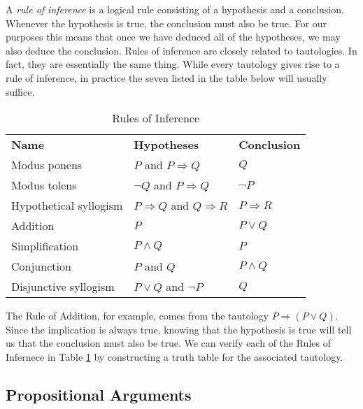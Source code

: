 A \emph{rule of inference} is a logical rule consisting of a hypothesis and a conclusion. Whenever the hypothesis is true, the conclusion must also be true. For our purposes this means that once we have deduced all of the hypotheses, we may also deduce the conclusion. Rules of inference are closely related to tautologies.  In fact, they are essentially the same thing. While every tautology gives rise to a rule of inference, in practice the seven listed in the table below will usually suffice.

{\renewcommand\arraystretch{1.2}
\begin{table}[htbp]
\centering
\caption{Rules of Inference}
\begin{tabular}{l l l}
&&\\
\hline 
\bfseries Name & \bfseries Hypotheses & \bfseries Conclusion\\
\hline
Modus ponens\index{rule of inference!modus ponens|textbf} & $P$ and $P\Rightarrow Q$ & $Q$\\
Modus tolens \index{rule of inference!modus tolens|textbf} & $\neg Q$ and $P\Rightarrow Q$ & $\neg P$\\
Hypothetical syllogism \index{rule of inference!hypothetical syllogism|textbf} & $P\Rightarrow Q$ and $Q\Rightarrow R$ & $P\Rightarrow R$\\
Addition \index{rule of inference!addition|textbf} & $P$ & $P\lor Q$\\
Simplification \index{rule of inference!simplification|textbf} & $P\land Q$ & $P$\\
Conjunction \index{rule of inference!conjunction|textbf} & $P$ and $Q$ & $P\land Q$\\
Disjunctive syllogism \index{rule of inference!disjunctive syllogism|textbf} & $P\lor Q$ and $\neg P$ & $Q$\\
\end{tabular}
\label{table:inference}
\end{table}}

The Rule of Addition, for example, comes from the tautology $P\Rightarrow(P\lor Q)$. Since the implication is always true, knowing that the hypothesis is true will tell us that the conclusion must also be true. We can verify each of the Rules of Infernece in Table \ref{table:inference} by constructing a truth table for the associated tautology.

\subsection{Propositional Arguments}

